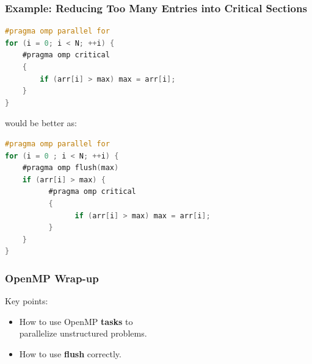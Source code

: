 \begin{frame}[fragile]
  \frametitle{Example: Reducing Too Many Entries into Critical Sections}

  \large
  \begin{lstlisting}[language=C,morekeywords={foreach,pragma,omp,parallel,single,nowait,task,untied,barrier,taskyield,mergeable,final,taskwait,critical}]
#pragma omp parallel for
for (i = 0; i < N; ++i) { 
    #pragma omp critical
    {
        if (arr[i] > max) max = arr[i];
    } 
}
  \end{lstlisting}

would be better as:

  \begin{lstlisting}[language=C,morekeywords={foreach,pragma,omp,parallel,single,nowait,task,untied,barrier,taskyield,mergeable,final,taskwait,critical}]
#pragma omp parallel for
for (i = 0 ; i < N; ++i) { 
    #pragma omp flush(max)
    if (arr[i] > max) {
          #pragma omp critical
          {
                if (arr[i] > max) max = arr[i];
          }
    }
}
  \end{lstlisting}
  
\end{frame}

\begin{frame}
  \frametitle{OpenMP Wrap-up}

\Large
    Key points:\\
  \begin{itemize}
    \item How to use OpenMP {\bf tasks} to\\ \hspace*{2em} parallelize unstructured problems.
    \item How to use {\bf flush} correctly.
  \end{itemize}
  
\end{frame}




